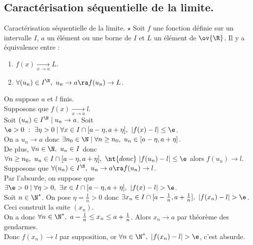 \documentclass[11pt]{article}
\begin{document}
\subsection{Caractérisation séquentielle de la limite.}

\begin{thm}{Caractérisation séquentielle de la limite. $\star$}{}
    Soit $f$ une fonction définie sur un intervalle $I$, $a$ un élément ou une borne de $I$ et $L$ un élément de $\ov{\R}$. Il y a équivalence entre :
    \begin{enumerate}
        \item $f(x)\xrightarrow[x\to a]{}L$.
        \item $\forall (u_n) \in I^\N, ~ u_n \to a \ra f(u_n)\to L$.
    \end{enumerate}
    \tcblower
    On suppose $a$ et $l$ finis.\\
    \boxed{\ra} Supposons que $f(x)\xrightarrow[x\to a]{} l$. \\
    Soit $(u_n)\in I^\N \mid u_n \to a$. Soit $\e>0 ~:~ \exists \eta > 0 \mid \forall x \in I\cap[a-\eta,a+\eta], ~ |f(x)-l|\leq \e$.\\
    On a $u_n\to a$ donc $\exists n_0 \in \N \mid \forall n \geq n_0, ~ u_n \in [a-\eta, a +\eta]$.\\
    De plus, $\forall n \in \N, ~ u_n \in I$ donc $\forall n \geq n_0, ~ u_n\in I\cap[a-\eta,a+\eta], ~\nt{donc}~ |f(u_n)-l|\leq \e$ alors $f(u_n)\to l$.\\
    \boxed{\la} Supposons que $\forall(u_n)\in I^\N, ~ u_n\to a \ra f(u_n)\to l$.\\
    Par l'absurde, on suppose que $\exists \e>0 \mid \forall \eta>0, ~ \exists x \in I\cap[a-\eta,a+\eta], ~ |f(x)-l|>\e$.\\
    Soit $n\in\N^*$. On pose $\eta=\frac{1}{n}>0$ donc $\exists x_n \in I\cap[a-\frac{1}{n},a+\frac{1}{n}],~ |f(x_n)-l|>\e$. Ceci construit la suite $(x_n)$.\\
    On a donc $\forall n \in \N^*, ~ a-\frac{1}{n}\leq x_n \leq a+\frac{1}{n}$. Alors $x_n\to a$ par théorème des gendarmes.\\
    Donc $f(x_n)\to l$ par supposition, or $\forall n \in \N^*, ~ |f(x_n)-l|>\e$, c'est absurde. 
\end{thm}

\vspace*{-0.4cm}
\end{document}
